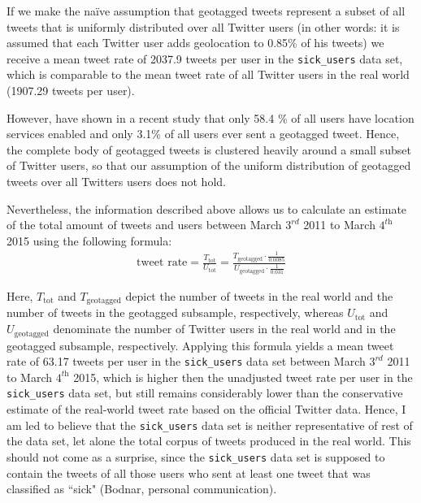 \documentclass[11pt, a4paper,twoside]{report}\usepackage[]{graphicx}\usepackage[]{color}
\begin{document}
If we make the naïve assumption that geotagged tweets represent a subset of all tweets that is uniformly distributed over all Twitter users (in other words: it is assumed that each Twitter user adds geolocation to 0.85\% of his tweets) we receive a mean tweet rate of 2037.9 tweets per user in the \texttt{sick\_users} data set, which is comparable to the mean tweet rate of all Twitter users in the real world (1907.29 tweets per user).

However, \cite{sloan_who_2015} have shown in a recent study that only 58.4 \% of all users have location services enabled and only 3.1\% of all users ever sent a geotagged tweet. Hence, the complete body of geotagged tweets is clustered heavily around a small subset of Twitter users, so that our assumption of the uniform distribution of geotagged tweets over all Twitters users does not hold.

Nevertheless, the information described above allows us to calculate an estimate of the total amount of tweets and users between March $3^\textit{rd}$ 2011 to March $4^\textit{th}$ 2015 using the following formula:
  \begin{align}
\text{tweet rate} = \frac{T_{\text{tot}}}{U_\text{tot}} = \frac{T_{\text{geotagged}} \cdot \frac{1}{0.0085}}{U_\text{geotagged} \cdot \frac{1}{0.031}} \label{eq:3}
  \end{align}

Here, $T_\text{tot}$ and $T_\text{geotagged}$ depict the number of tweets in the real world and the number of tweets in the geotagged subsample, respectively, whereas $U_\text{tot}$ and $U_\text{geotagged}$ denominate the number of Twitter users in the real world and in the geotagged subsample, respectively. 
Applying this formula yields a mean tweet rate of 63.17 tweets per user in the \texttt{sick\_users} data set between March $3^\textit{rd}$ 2011 to March $4^\textit{th}$ 2015, which is higher then the unadjusted tweet rate per user in the \texttt{sick\_users} data set, but still remains considerably lower than the conservative estimate of the real-world tweet rate based on the official Twitter data. Hence, I am led to believe that the \texttt{sick\_users} data set is neither representative of rest of the data set, let alone the total corpus of tweets produced in the real world. This should not come as a surprise, since the \texttt{sick\_users} data set is supposed to contain the tweets of all those users who sent at least one tweet that was classified as ``sick" (Bodnar, personal communication).
\end{document}
